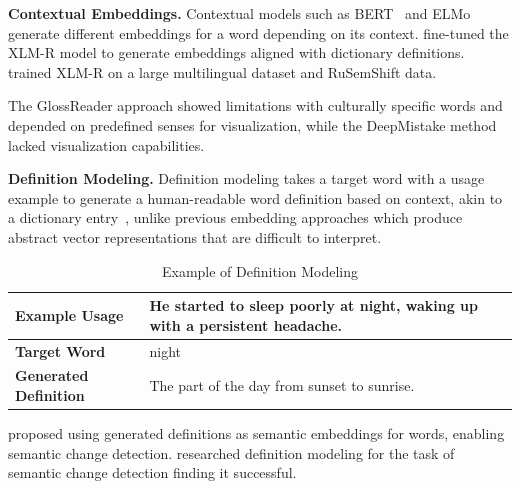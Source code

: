 \documentclass[11pt]{article}
\begin{document}
\textbf{Contextual Embeddings.}
Contextual models such as BERT~\cite{BERTOriginal} and ELMo~\cite{ELMOOriginal} generate different embeddings for a word depending on its context.
 fine-tuned the XLM-R model to generate embeddings aligned with dictionary definitions.
 trained XLM-R on a large multilingual dataset and RuSemShift data.

The GlossReader approach showed limitations with culturally specific words and depended on predefined senses for visualization,
while the DeepMistake method lacked visualization capabilities.

\textbf{Definition Modeling.}
Definition modeling takes a target word with a usage example to generate a human-readable word definition based on context,
akin to a dictionary entry~\cite{DefinitionGenerationMainArticle},
unlike previous embedding approaches which produce abstract vector representations that are difficult to interpret.

\begin{table}[H]
\centering
\caption{Example of Definition Modeling}
\label{tab:Definition modeling example}
\begin{tabular}{|l|p{10cm}|}
\hline
\textbf{Example Usage} & He started to sleep poorly at night, waking up with a persistent headache. \\
\hline
\textbf{Target Word} & night \\
\hline
\textbf{Generated Definition} & The part of the day from sunset to sunrise. \\
\hline
\end{tabular}
\end{table}

 proposed using generated definitions as semantic embeddings for words, enabling semantic change detection.
 researched definition modeling for the task of semantic change detection finding it successful.
\end{document}
